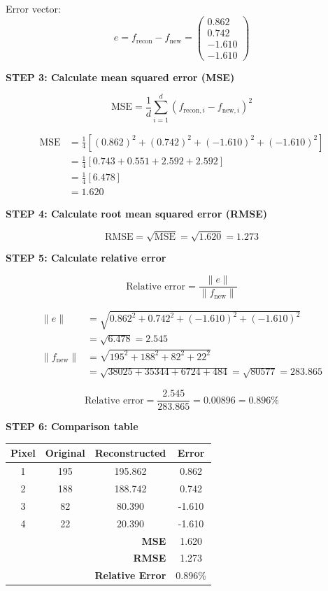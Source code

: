 \documentclass[12pt]{article}
\begin{document}
\begin{solution}
Error vector:
\[
e = f_{\text{recon}} - f_{\text{new}} = \begin{pmatrix}
0.862 \\
0.742 \\
-1.610 \\
-1.610
\end{pmatrix}
\]

\textbf{STEP 3: Calculate mean squared error (MSE)}

\[
\text{MSE} = \frac{1}{d}\sum_{i=1}^d (f_{\text{recon},i} - f_{\text{new},i})^2
\]

\begin{align*}
\text{MSE} &= \frac{1}{4}[(0.862)^2 + (0.742)^2 + (-1.610)^2 + (-1.610)^2] \\
&= \frac{1}{4}[0.743 + 0.551 + 2.592 + 2.592] \\
&= \frac{1}{4}[6.478] \\
&= 1.620
\end{align*}

\textbf{STEP 4: Calculate root mean squared error (RMSE)}

\[
\text{RMSE} = \sqrt{\text{MSE}} = \sqrt{1.620} = 1.273
\]

\textbf{STEP 5: Calculate relative error}

\[
\text{Relative error} = \frac{\|e\|}{\|f_{\text{new}}\|}
\]

\begin{align*}
\|e\| &= \sqrt{0.862^2 + 0.742^2 + (-1.610)^2 + (-1.610)^2} \\
&= \sqrt{6.478} = 2.545 \\
\|f_{\text{new}}\| &= \sqrt{195^2 + 188^2 + 82^2 + 22^2} \\
&= \sqrt{38025 + 35344 + 6724 + 484} = \sqrt{80577} = 283.865
\end{align*}

\[
\text{Relative error} = \frac{2.545}{283.865} = 0.00896 = 0.896\%
\]

\textbf{STEP 6: Comparison table}

\begin{center}
\begin{tabular}{c|c|c|c}
\textbf{Pixel} & \textbf{Original} & \textbf{Reconstructed} & \textbf{Error} \\
\hline
1 & 195 & 195.862 & 0.862 \\
2 & 188 & 188.742 & 0.742 \\
3 & 82 & 80.390 & -1.610 \\
4 & 22 & 20.390 & -1.610 \\
\hline
\multicolumn{3}{r|}{\textbf{MSE}} & 1.620 \\
\multicolumn{3}{r|}{\textbf{RMSE}} & 1.273 \\
\multicolumn{3}{r|}{\textbf{Relative Error}} & 0.896\%
\end{tabular}
\end{center}


\end{solution}
\end{document}
